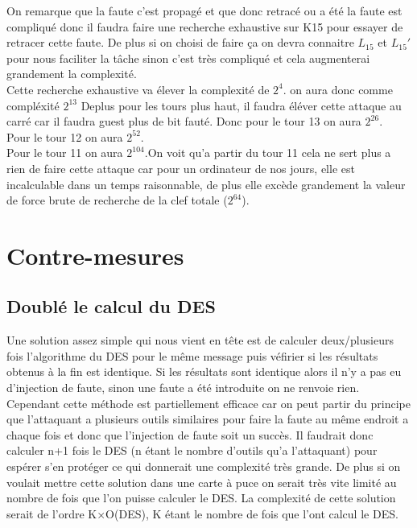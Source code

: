 \documentclass[a4paper,10pt]{report}
\begin{document}
			On remarque que la faute c'est propagé et que donc retracé ou a été la faute est compliqué donc il faudra faire une recherche exhaustive sur K15 pour essayer de retracer cette faute. De plus si on choisi de faire ça on devra connaitre $L_15$ et $L_15'$ pour nous faciliter la tâche sinon c'est très compliqué et cela augmenterai grandement la complexité.\\ 
			Cette recherche exhaustive va élever la complexité de $2^{4}$. on aura donc comme compléxité $2^{13}$
			Deplus pour les tours plus haut, il faudra éléver cette attaque au carré car il faudra guest plus de bit fauté.
			Donc pour le tour 13 on aura $2^{26}$.\\
			Pour le tour 12 on aura $2^{52}$.\\
			Pour le tour 11 on aura $2^{104}$.On voit qu'a partir du tour 11 cela ne sert plus a rien de faire cette attaque car pour un ordinateur de nos jours, elle est incalculable dans un temps raisonnable, de plus elle excède grandement la valeur de force brute de recherche de la clef totale ($2^{64}$).
		\chapter{Contre-mesures}
			\section{Doublé le calcul du DES}
				Une solution assez simple qui nous vient en tête est de calculer deux/plusieurs fois l'algorithme du DES pour le même message puis véfirier si les résultats obtenus à la fin est
				identique.
				Si les résultats sont identique alors il n'y a pas eu d'injection de faute, sinon une faute a été introduite on ne renvoie rien.
				Cependant cette méthode est partiellement efficace car on peut partir du principe que l'attaquant a plusieurs outils similaires pour faire la faute au même endroit a chaque fois et 
				donc que l'injection de faute soit un succès. 
				Il faudrait donc calculer n+1 fois le DES (n étant le nombre d'outils qu'a l'attaquant) pour espérer s'en protéger ce qui donnerait une complexité très grande. 
				De plus si on voulait mettre cette solution dans une carte à puce on serait très vite limité au nombre de fois que l'on puisse calculer le DES.
				La complexité de cette solution serait de l'ordre K$\times$O(DES), K étant le nombre de fois que l'ont calcul le DES.
\end{document}
